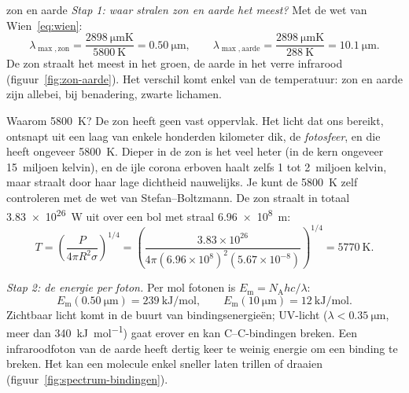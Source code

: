 \begin{casusuitgewerkt}{zon en aarde}
\emph{Stap 1: waar stralen zon en aarde het meest?} Met de wet van Wien~\eqref{eq:wien}:
\[
\lambda_{\max,\text{zon}} = \frac{\SI{2898}{\micro\metre\kelvin}}{\SI{5800}{\kelvin}} = \SI{0.50}{\micro\metre}, \qquad
\lambda_{\max,\text{aarde}} = \frac{\SI{2898}{\micro\metre\kelvin}}{\SI{288}{\kelvin}} = \SI{10.1}{\micro\metre}.
\]
De zon straalt het meest in het groen, de aarde in het verre infrarood (figuur~\ref{fig:zon-aarde}). Het verschil komt enkel van de temperatuur: zon en aarde zijn allebei, bij benadering, zwarte lichamen.

Waarom \SI{5800}{\kelvin}? De zon heeft geen vast oppervlak. Het licht dat ons bereikt, ontsnapt uit een laag van enkele honderden kilometer dik, de \emph{fotosfeer}, en die heeft ongeveer \SI{5800}{\kelvin}. Dieper in de zon is het veel heter (in de kern ongeveer 15~miljoen kelvin), en de ijle corona erboven haalt zelfs 1 tot 2~miljoen kelvin, maar straalt door haar lage dichtheid nauwelijks. Je kunt de \SI{5800}{\kelvin} zelf controleren met de wet van Stefan--Boltzmann. De zon straalt in totaal \SI{3.83e26}{\watt} uit over een bol met straal \SI{6.96e8}{\metre}:
\[
T = \left(\frac{P}{4\pi R^2\sigma}\right)^{1/4} = \left(\frac{3.83\times10^{26}}{4\pi(6.96\times10^{8})^2(5.67\times10^{-8})}\right)^{1/4} = \SI{5770}{\kelvin}.
\]

\emph{Stap 2: de energie per foton.} Per mol fotonen is $E_\mathrm{m} = N_\mathrm{A}hc/\lambda$:
\[
E_\mathrm{m}(\SI{0.50}{\micro\metre}) = \SI{239}{\kilo\joule\per\mole}, \qquad
E_\mathrm{m}(\SI{10}{\micro\metre}) = \SI{12}{\kilo\joule\per\mole}.
\]
Zichtbaar licht komt in de buurt van bindingsenergieën; UV-licht ($\lambda < \SI{0.35}{\micro\metre}$, meer dan \SI{340}{\kilo\joule\per\mole}) gaat erover en kan C--C-bindingen breken. Een infraroodfoton van de aarde heeft dertig keer te weinig energie om een binding te breken. Het kan een molecule enkel sneller laten trillen of draaien (figuur~\ref{fig:spectrum-bindingen}).


\end{casusuitgewerkt}
